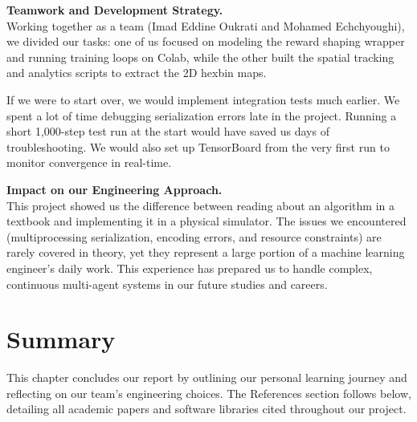 \bigskip
\noindent\textbf{Teamwork and Development Strategy.} \\
Working together as a team (Imad Eddine Oukrati and Mohamed Echchyoughi), we divided our tasks: one of us focused on modeling the reward shaping wrapper and running training loops on Colab, while the other built the spatial tracking and analytics scripts to extract the 2D hexbin maps. 

If we were to start over, we would implement integration tests much earlier. We spent a lot of time debugging serialization errors late in the project. Running a short 1,000-step test run at the start would have saved us days of troubleshooting. We would also set up TensorBoard from the very first run to monitor convergence in real-time.

\bigskip
\noindent\textbf{Impact on our Engineering Approach.} \\
This project showed us the difference between reading about an algorithm in a textbook and implementing it in a physical simulator. The issues we encountered (multiprocessing serialization, encoding errors, and resource constraints) are rarely covered in theory, yet they represent a large portion of a machine learning engineer's daily work. This experience has prepared us to handle complex, continuous multi-agent systems in our future studies and careers.

\section{Summary}
\label{sec:reflection_summary}

This chapter concludes our report by outlining our personal learning journey and reflecting on our team's engineering choices. The References section follows below, detailing all academic papers and software libraries cited throughout our project.